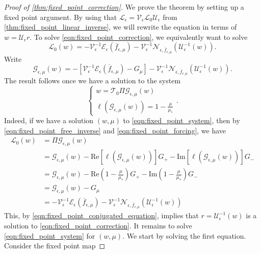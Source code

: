 \documentclass[11pt]{amsart}
\theoremstyle{definition}
\theoremstyle{remark}
\numberwithin{equation}{section}
\newcommand{\mc}[1]{\mathcal{#1}}
\newcommand{\ov}[1]{\overline{#1}}
\begin{document}
\begin{proof}[Proof of \cref{thm:fixed_point_correction}]
We prove the theorem by setting up a fixed point argument. By using that $\mc{L}_\epsilon = \mc{V}_\epsilon \mc{L}_0 \mc{U}_\epsilon$ from \cref{thm:fixed_point_linear_inverse}, we will rewrite the equation in terms of $w = \mc{U}_\epsilon r$. To solve \eqref{eqn:fixed_point_correction}, we equivalently want to solve
\begin{equation}\label{eqn:fixed_point_conjugated_equation}
\mc{L}_0(w) = - \mc{V}_\epsilon^{-1} \mc{E}_\epsilon(\ov{f}_{\epsilon, \mu}) - \mc{V}_\epsilon^{-1}\mc{N}_{\epsilon, \ov{f}_{\epsilon, \mu}}(\mc{U}_\epsilon^{-1}(w)).
\end{equation}
Write 
\begin{equation}\label{eqn:fixed_point_forcing}
\mc{G}_{\epsilon, \mu}(w) = - [\mc{V}_\epsilon^{-1} \mc{E}_\epsilon(\ov{f}_{\epsilon, \mu}) - G_\mu] - \mc{V}_\epsilon^{-1}\mc{N}_{\epsilon, \ov{f}_{\epsilon, \mu}}(\mc{U}_\epsilon^{-1}(w)).
\end{equation}
The result follows once we have a solution to the system
\begin{equation}\label{eqn:fixed_point_system}
\begin{cases}
    w = \mc{T}_0\Pi \mc{G}_{\epsilon, \mu}(w) \\
    \ell(\mc{G}_{\epsilon, \mu}(w)) = 1 - \frac{\mu}{\mu_*}
\end{cases}.
\end{equation}
Indeed, if we have a solution $(w, \mu)$ to \eqref{eqn:fixed_point_system}, then by \eqref{eqn:fixed_point_free_inverse} and \eqref{eqn:fixed_point_forcing}, we have 
\begin{align*}
    \mc{L}_0(w) & = \Pi \mc{G}_{\epsilon, \mu}(w) \\ 
    & = \mc{G}_{\epsilon, \mu}(w) - \text{Re}[\ell(\mc{G}_{\epsilon, \mu}(w))]G_+ - \text{Im}[\ell(\mc{G}_{\epsilon, \mu}(w))]G_- \\
    & = \mc{G}_{\epsilon, \mu}(w) - \text{Re}\left(1 - \frac{\mu}{\mu_*}\right)G_+ - \text{Im}\left(1 - \frac{\mu}{\mu_*}\right)G_- \\
    & = \mc{G}_{\epsilon, \mu}(w) - G_\mu \\
    & = - \mc{V}_\epsilon^{-1} \mc{E}_\epsilon(\ov{f}_{\epsilon, \mu}) - \mc{V}_\epsilon^{-1}\mc{N}_{\epsilon, \ov{f}_{\epsilon, \mu}}(\mc{U}_\epsilon^{-1}(w))
\end{align*}
This, by \eqref{eqn:fixed_point_conjugated_equation}, implies that $r = \mc{U}_\epsilon^{-1}(w)$ is a solution to \eqref{eqn:fixed_point_correction}. It remains to solve \eqref{eqn:fixed_point_system} for $(w, \mu)$. We start by solving the first equation. Consider the fixed point map

\end{proof}
\end{document}
